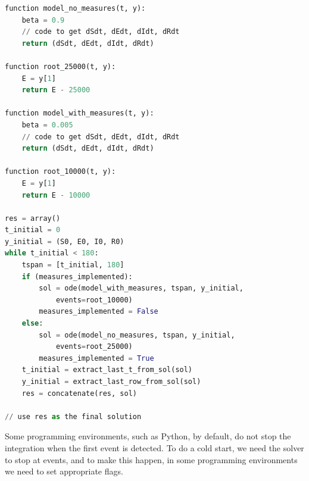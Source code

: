 \begin{minipage}{\linewidth}
\centering
\begin{lstlisting}[language=Python]
function model_no_measures(t, y):
    beta = 0.9
    // code to get dSdt, dEdt, dIdt, dRdt
    return (dSdt, dEdt, dIdt, dRdt)

function root_25000(t, y):
    E = y[1]
    return E - 25000

function model_with_measures(t, y):
    beta = 0.005
    // code to get dSdt, dEdt, dIdt, dRdt
    return (dSdt, dEdt, dIdt, dRdt)

function root_10000(t, y):
    E = y[1]
    return E - 10000

res = array()
t_initial = 0
y_initial = (S0, E0, I0, R0)
while t_initial < 180:
    tspan = [t_initial, 180]
    if (measures_implemented):
        sol = ode(model_with_measures, tspan, y_initial,
            events=root_10000)
        measures_implemented = False
    else:
        sol = ode(model_no_measures, tspan, y_initial,
            events=root_25000)
        measures_implemented = True
    t_initial = extract_last_t_from_sol(sol)
    y_initial = extract_last_row_from_sol(sol)
    res = concatenate(res, sol)

// use res as the final solution
\end{lstlisting}
\end{minipage}

Some programming environments, such as Python, by default, do not stop the integration when the first event is detected. To do a cold start, we need the solver to stop at events, and to make this happen, in some programming environments we need to set appropriate flags. 

